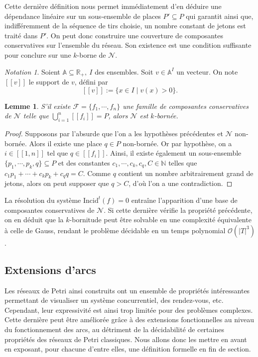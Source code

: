 \documentclass{article}
\newtheorem{lemma}{Lemme}
\theoremstyle{remark}
\theoremstyle{remark}
\newtheorem*{notation}{Notation}
\newcommand{\incid}{\mathrm{Incid}}
\newcommand{\supp}[1]{[\![#1]\!]}
\begin{document}
Cette dernière définition nous permet immédiatement d'en déduire une dépendance linéaire sur un sous-ensemble de places $P' \subseteq P$ qui garantit ainsi que, indifféremment de la séquence de tirs choisie, un nombre constant de jetons est traité dans $P'$. On peut donc construire une couverture de composantes conservatives sur l'ensemble du réseau. Son existence est une condition suffisante pour conclure sur une $k$-borne de $\mathcal{N}$.

\begin{notation}
    Soient $\mathbb{A} \subseteq \mathbb{R}_+,\ I$ des ensembles. Soit $v \in \mathbb{A}^I$ un vecteur. On note $[\![v]\!]$ le support de $v$, défini par \[[\![v]\!] := \{x \in I \mid v(x) > 0\}.\]
\end{notation}

\begin{lemma}
    S'il existe $\mathcal{F} = \{f_1, \cdots, f_n\}$ une famille de composantes conservatives de $\mathcal{N}$ telle que $\bigcup_{i = 1}^n [\![f_i]\!] = P$, alors $\mathcal{N}$ est $k$-bornée.
\end{lemma}

\begin{proof}
    Supposons par l'absurde que l'on a les hypothèses précédentes et $\mathcal{N}$ non-bornée. Alors il existe une place $q \in P$ non-bornée. Or par hypothèse, on a $i \in [\![1, n]\!]$ tel que $q \in \supp{f_i}$. Ainsi, il existe également un sous-ensemble $\{p_1, \cdots, p_k, q\} \subseteq P$ et des constantes $c_1, \cdots, c_k, c_q, C \in \mathbb{N}$ telles que $c_1p_1 + \cdots + c_kp_k + c_qq = C$. Comme $q$ contient un nombre arbitrairement grand de jetons, alors on peut supposer que $q > C$, d'où l'on a une contradiction.
\end{proof}

La résolution du système $\incid^t(f) = 0$ entraîne l'apparition d'une base de composantes conservatives de $\mathcal{N}$. Si cette dernière vérifie la propriété précédente, on en déduit que la $k$-bornitude peut être solvable en une complexité équivalente à celle de Gauss, rendant le problème décidable en un temps polynomial $\mathcal{O}(|T|^3)$.

\subsection{Extensions d'arcs}

Les réseaux de Petri ainsi construits ont un ensemble de propriétés intéressantes permettant de visualiser un système concurrentiel, des rendez-vous, etc. Cependant, leur expressivité est ainsi trop limitée pour des problèmes complexes. Cette dernière peut être améliorée grâce à des extensions fonctionnelles au niveau du fonctionnement des arcs, au détriment de la décidabilité de certaines propriétés des réseaux de Petri classiques. Nous allons donc les mettre en avant en exposant, pour chacune d'entre elles, une définition formelle en fin de section.
\end{document}
